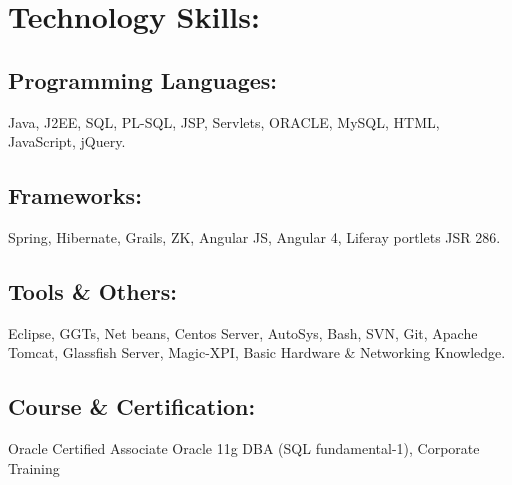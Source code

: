 \documentclass{article}
\begin{document}
\section{Technology Skills:}
\subsection{Programming Languages:}
Java, J2EE, SQL, PL-SQL, JSP, Servlets, ORACLE, MySQL, HTML, JavaScript, jQuery.
\subsection{Frameworks:}
 Spring, Hibernate, Grails, ZK, Angular JS, Angular 4, Liferay portlets JSR 286.
\subsection{Tools \& Others:} Eclipse, GGTs, Net beans, Centos Server, AutoSys, Bash, SVN, Git, Apache Tomcat, Glassfish Server, Magic-XPI, Basic Hardware \& Networking Knowledge.
\subsection{Course \& Certification:}
Oracle Certified Associate Oracle 11g DBA (SQL fundamental-1), Corporate Training
\end{document}
